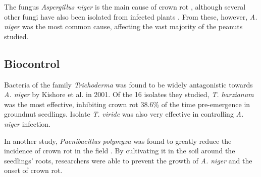 \documentclass[letterpaper, 12pt]{report}
\begin{document}
The fungus \emph{Aspergillus niger} is the main cause of crown rot \autocite{gibson1953crown}, although several other fungi have also been isolated from infected plants \autocite{suzui1980occurrence}.  From these, however, \emph{A. niger} was the most common cause, affecting the vast majority of the peanuts studied.

\subsection{Biocontrol}

Bacteria of the family \emph{Trichoderma} was found to be widely antagonistic towards \emph{A. niger} by Kishore et al. in 2001. Of the 16 isolates they studied, \emph{T. harzianum} was the most effective, inhibiting crown rot 38.6\% of the time pre-emergence in groundnut seedlings. Isolate \emph{T. viride} was also very effective in controlling \emph{A. niger} infection.

In another study, \emph{Paenibacillus polymyxa} was found to greatly reduce the incidence of crown rot in the field \autocite{haggag2008colonization}. By cultivating it in the soil around the seedlings' roots, researchers were able to prevent the growth of \emph{A. niger} and the onset of crown rot.

\printbibliography[title=References]
\end{document}
